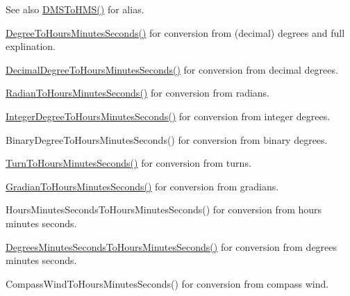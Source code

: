 \begin{DoxySeeAlso}{See also}
\mbox{\hyperlink{group___e_g_x_math-_angle_conversions-_d_m_s_ga570e90c6555753cccfcaa55f0e6374ac}{D\+M\+S\+To\+H\+M\+S()}} for alias. 

\mbox{\hyperlink{group___e_g_x_math-_angle_conversions-_degree_ga770b13da33b6f6c7bfa398cca7f24dbe}{Degree\+To\+Hours\+Minutes\+Seconds()}} for conversion from (decimal) degrees and full explination. 

\mbox{\hyperlink{group___e_g_x_math-_angle_conversions-_decimal_degree_gaa3f0b6c7c497882935487ad2d55a0f5a}{Decimal\+Degree\+To\+Hours\+Minutes\+Seconds()}} for conversion from decimal degrees. 

\mbox{\hyperlink{group___e_g_x_math-_angle_conversions-_radian_ga3467598d89af2b8ff68af50b39bb19e2}{Radian\+To\+Hours\+Minutes\+Seconds()}} for conversion from radians. 

\mbox{\hyperlink{group___e_g_x_math-_angle_conversions-_integer_degree_gaaac96728b305fd8ed024843f4e92fd08}{Integer\+Degree\+To\+Hours\+Minutes\+Seconds()}} for conversion from integer degrees. 

Binary\+Degree\+To\+Hours\+Minutes\+Seconds() for conversion from binary degrees. 

\mbox{\hyperlink{group___e_g_x_math-_angle_conversions-_turn_ga0bc017b3314253352ddec728d3f6b76a}{Turn\+To\+Hours\+Minutes\+Seconds()}} for conversion from turns. 

\mbox{\hyperlink{group___e_g_x_math-_angle_conversions-_gradian_gaf174cf5b716d5a490b3744ffe9ff3b97}{Gradian\+To\+Hours\+Minutes\+Seconds()}} for conversion from gradians. 

Hours\+Minutes\+Seconds\+To\+Hours\+Minutes\+Seconds() for conversion from hours minutes seconds. 

\mbox{\hyperlink{group___e_g_x_math-_angle_conversions-_degrees_minutes_seconds_ga7fc14ecc37f95ec9228821c3a087e83b}{Degrees\+Minutes\+Seconds\+To\+Hours\+Minutes\+Seconds()}} for conversion from degrees minutes seconds. 

Compass\+Wind\+To\+Hours\+Minutes\+Seconds() for conversion from compass wind. 
\end{DoxySeeAlso}
\mbox{\label{group___e_g_x_math-_angle_conversions-_d_m_s_ga648345592a9116cccda50f476df28586}} 
